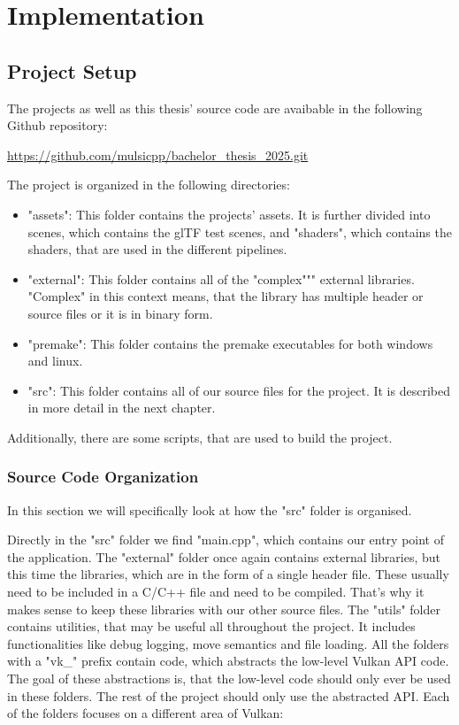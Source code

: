 
\chapter{Implementation}\label{chapter:implementation}

\section{Project Setup}

The projects as well as this thesis' source code are avaibable in the following Github repository:

\url{https://github.com/mulsicpp/bachelor_thesis_2025.git}

The project is organized in the following directories:

\begin{itemize}
    \item "assets": This folder contains the projects' assets. It is further divided into scenes, which contains the glTF test scenes, and "shaders", which contains the shaders, that are used in the different pipelines.
    \item "external": This folder contains all of the "complex""" external libraries. "Complex" in this context means, that the library has multiple header or source files or it is in binary form.
    \item "premake": This folder contains the premake executables for both windows and linux.
    \item "src": This folder contains all of our source files for the project. It is described in more detail in the next chapter.
\end{itemize}

Additionally, there are some scripts, that are used to build the project.

\subsection{Source Code Organization}

In this section we will specifically look at how the "src" folder is organised.

Directly in the "src" folder we find "main.cpp", which contains our entry point of the application.
The "external" folder once again contains external libraries, but this time the libraries, which are in the form of a single header file. These usually need to be included in a C/C++ file and need to be compiled. That's why it makes sense to keep these libraries with our other source files.
The "utils" folder contains utilities, that may be useful all throughout the project. It includes functionalities like debug logging, move semantics and file loading.
All the folders with a "vk\_" prefix contain code, which abstracts the low-level Vulkan API code. The goal of these abstractions is, that the low-level code should only ever be used in these folders. The rest of the project should only use the abstracted API. Each of the folders focuses on a different area of Vulkan:

